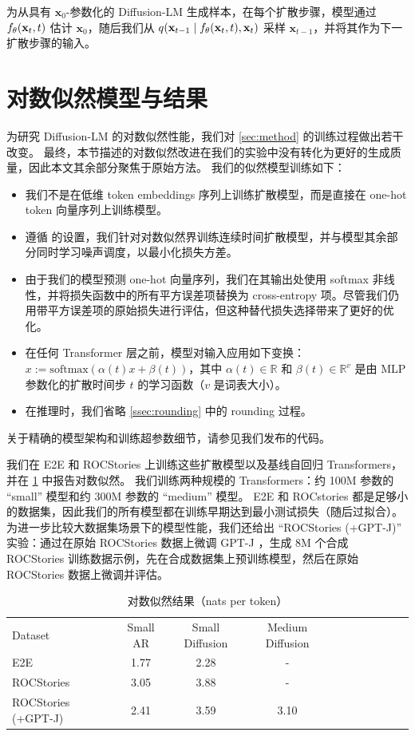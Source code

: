 \documentclass{article}
\newcommand{\cx}[1]{\mathbf{x}_{#1}}
\begin{document}
为从具有 $\cx{0}$-参数化的 Diffusion-LM 生成样本，在每个扩散步骤，模型通过 $\xxtheta (\cx{t}, t)$ 估计 $\cx{0}$，随后我们从 $q(\cx{t-1} \mid \xxtheta (\cx{t}, t), \cx{t})$ 采样 $\cx{t-1}$，并将其作为下一扩散步骤的输入。






\section{对数似然模型与结果}
\label{app:simplex}

为研究 Diffusion-LM 的对数似然性能，我们对 \cref{sec:method} 的训练过程做出若干改变。
最终，本节描述的对数似然改进在我们的实验中没有转化为更好的生成质量，因此本文其余部分聚焦于原始方法。
我们的似然模型训练如下：
\begin{itemize}
    \item 我们不是在低维 token embeddings 序列上训练扩散模型，而是直接在 one-hot token 向量序列上训练模型。
    \item 遵循 \citet{kingma2021variational} 的设置，我们针对对数似然界训练连续时间扩散模型，并与模型其余部分同时学习噪声调度，以最小化损失方差。
    \item 由于我们的模型预测 one-hot 向量序列，我们在其输出处使用 softmax 非线性，并将损失函数中的所有平方误差项替换为 cross-entropy 项。尽管我们仍用带平方误差项的原始损失进行评估，但这种替代损失选择带来了更好的优化。
    \item 在任何 Transformer 层之前，模型对输入应用如下变换：$x := \mathrm{softmax}(\alpha(t) x + \beta(t))$，其中 $\alpha(t) \in \mathbb{R}$ 和 $\beta(t) \in \mathbb{R}^v$ 是由 MLP 参数化的扩散时间步 $t$ 的学习函数（$v$ 是词表大小）。
    \item 在推理时，我们省略 \cref{ssec:rounding} 中的 rounding 过程。
\end{itemize}
关于精确的模型架构和训练超参数细节，请参见我们发布的代码。

我们在 E2E 和 ROCStories 上训练这些扩散模型以及基线自回归 Transformers，并在 \cref{tab:ppl} 中报告对数似然。
我们训练两种规模的 Transformers：约 100M 参数的 ``small'' 模型和约 300M 参数的 ``medium'' 模型。
E2E 和 ROCstories 都是足够小的数据集，因此我们的所有模型都在训练早期达到最小测试损失（随后过拟合）。
为进一步比较大数据集场景下的模型性能，我们还给出 ``ROCStories (+GPT-J)'' 实验：通过在原始 ROCStories 数据上微调 GPT-J \citep{gpt-j}，生成 8M 个合成 ROCStories 训练数据示例，先在合成数据集上预训练模型，然后在原始 ROCStories 数据上微调并评估。

\begin{table}
    \centering
\begin{tabular}{lcc|cc|cc|cc|cc}
\toprule
    Dataset                & Small AR    & Small Diffusion     & Medium Diffusion\\
    E2E                    & 1.77    & 2.28 & -\\
    ROCStories             & 3.05    & 3.88 & -\\
    ROCStories (+GPT-J)    & 2.41    & 3.59 & 3.10\\

\bottomrule
\end{tabular}
\caption{\label{tab:ppl} 对数似然结果（nats per token）}
\end{table}
\end{document}
